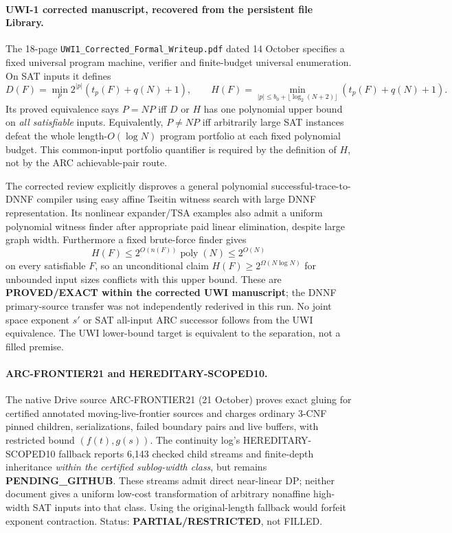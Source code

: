 \documentclass[11pt]{article}
\begin{document}
\paragraph{UWI-1 corrected manuscript, recovered from the persistent file Library.}
The 18-page \texttt{UWI1\_Corrected\_Formal\_Writeup.pdf} dated 14 October specifies a fixed universal program machine, verifier and finite-budget universal enumeration. On SAT inputs it defines
\[
D(F)=\min_p 2^{|p|}(t_p(F)+q(N)+1),\qquad
H(F)=\min_{|p|\le b_0+\lfloor\log_2(N+2)\rfloor}(t_p(F)+q(N)+1).
\]
Its proved equivalence says $P=NP$ iff $D$ or $H$ has one polynomial upper bound on \emph{all satisfiable} inputs. Equivalently, $P\ne NP$ iff arbitrarily large SAT instances defeat the whole length-$O(\log N)$ program portfolio at each fixed polynomial budget. This common-input portfolio quantifier is required by the definition of $H$, not by the ARC achievable-pair route.

The corrected review explicitly disproves a general polynomial successful-trace-to-DNNF compiler using easy affine Tseitin witness search with large DNNF representation. Its nonlinear expander/TSA examples also admit a uniform polynomial witness finder after appropriate paid linear elimination, despite large graph width. Furthermore a fixed brute-force finder gives
\[
H(F)\le2^{O(n(F))}\operatorname{poly}(N)\le2^{O(N)}
\]
on every satisfiable $F$, so an unconditional claim $H(F)\ge2^{\Omega(N\log N)}$ for unbounded input sizes conflicts with this upper bound. These are \textbf{PROVED/EXACT within the corrected UWI manuscript}; the DNNF primary-source transfer was not independently rederived in this run. No joint space exponent $s'$ or SAT all-input ARC successor follows from the UWI equivalence. The UWI lower-bound target is equivalent to the separation, not a filled premise.

\paragraph{ARC-FRONTIER21 and HEREDITARY-SCOPED10.}
The native Drive source ARC-FRONTIER21 (21 October) proves exact gluing for certified annotated moving-live-frontier sources and charges ordinary 3-CNF pinned children, serializations, failed boundary pairs and live buffers, with restricted bound $(f(t),g(s))$. The continuity log's HEREDITARY-SCOPED10 fallback reports 6,143 checked child streams and finite-depth inheritance \emph{within the certified sublog-width class}, but remains \textbf{PENDING\_GITHUB}. These streams admit direct near-linear DP; neither document gives a uniform low-cost transformation of arbitrary nonaffine high-width SAT inputs into that class. Using the original-length fallback would forfeit exponent contraction. Status: \textbf{PARTIAL/RESTRICTED}, not FILLED.
\end{document}
